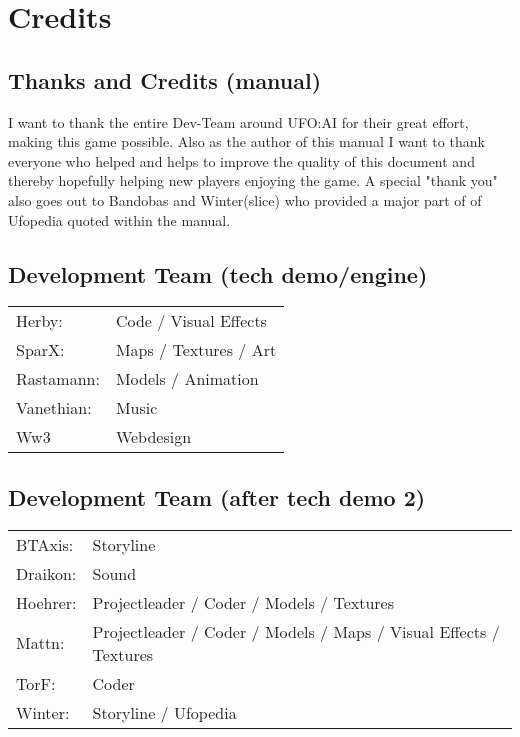 \newpage

\section{Credits}
\subsection{Thanks and Credits (manual)}
I want to thank the entire Dev-Team around UFO:AI for their great effort, making this game possible. Also as the author of this manual I want to thank everyone who helped and helps to improve the quality of this document and thereby hopefully helping new players enjoying the game. A special "thank you" also goes out to Bandobas and Winter(slice) who provided a major part of of Ufopedia quoted within the manual.

\subsection{Development Team (tech demo/engine)}
\begin{tabular}{ll}
Herby:  			&  Code / Visual Effects	\\ 
SparX:  			&  Maps / Textures / Art	\\ 
Rastamann:  	&  Models / Animation		\\ 
Vanethian:  		&  Music							\\ 
Ww3					&	 Webdesign					\\
\end{tabular} 

\subsection{Development Team (after tech demo 2)}

\begin{tabular}{ll}
BTAxis:  	& Storyline \\
Draikon:	& Sound \\	
Hoehrer:  	& Projectleader / Coder / Models / Textures \\
Mattn:  	& Projectleader / Coder / Models / Maps / Visual Effects / Textures \\
TorF:  		& Coder \\
Winter:		& Storyline / Ufopedia \\
\end{tabular} 

